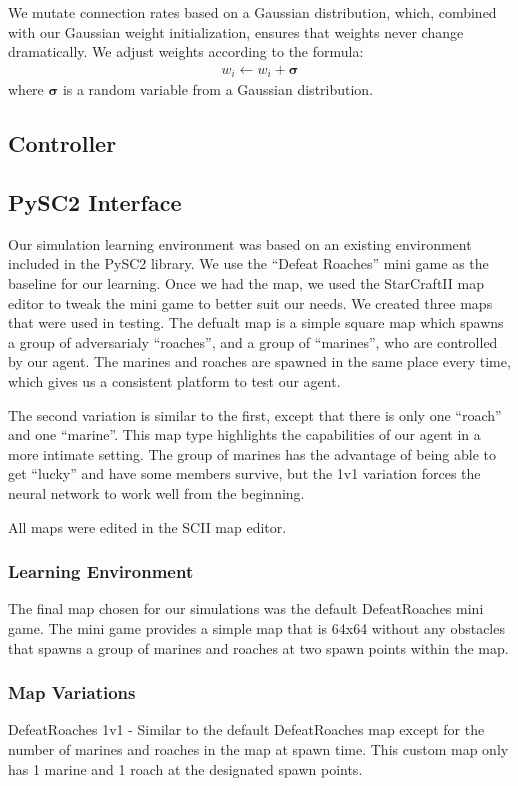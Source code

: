 \documentclass{article}
\begin{document}
\begin{multicols}{2}
We mutate connection rates based on a Gaussian distribution, which, combined
with our Gaussian weight initialization, ensures that weights never change
dramatically. We adjust weights according to the formula:
\begin{align}
  w_i \leftarrow w_i + \bm{\sigma}
\end{align}
where $\bm{\sigma}$ is a random variable from a Gaussian distribution.

\subsection{Controller}

\subsection{PySC2 Interface}
Our simulation learning environment was based on an existing environment
included in the PySC2 library\cite{pysc2}. We use the ``Defeat Roaches'' mini
game as the baseline for our learning. Once we had the map, we used the
StarCraftII map editor to tweak the mini game to better suit our needs. We
created three maps that were used in testing. The defualt map is a simple square
map which spawns a group of adversarialy ``roaches'', and a group of ``marines'',
who are controlled by our agent. The marines and roaches are spawned in the
same place every time, which gives us a consistent platform to test our agent.

The second variation is similar to the first, except that there is only one
``roach'' and one ``marine''. This map type highlights the capabilities of our
agent in a more intimate setting. The group of marines has the advantage of
being able to get ``lucky'' and have some members survive, but the 1v1
variation forces the neural network to work well from the beginning.

All maps were edited in the SCII map editor. 

\subsubsection{Learning Environment}
The final map chosen for our simulations was the default DefeatRoaches mini game. The mini game provides a simple map that is 64x64 without any obstacles that spawns a group of marines and roaches at two spawn points within the map. 

\subsubsection{Map Variations}
DefeatRoaches 1v1 - 
Similar to the default DefeatRoaches map except for the number of marines and 
roaches in the map at spawn time. This custom map only has 1 marine and 1 roach at the designated spawn points. 


\end{multicols}
\end{document}
